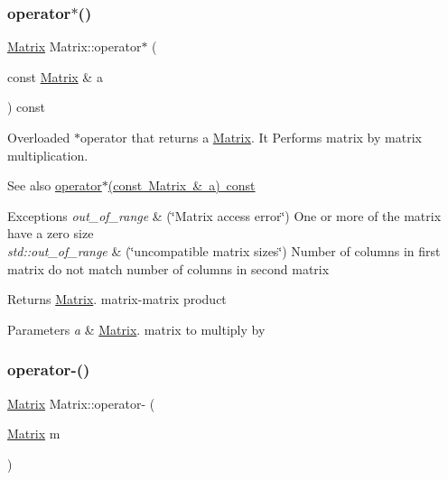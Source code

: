 \subsubsection{\texorpdfstring{operator$\ast$()}{operator*()}}
{\footnotesize\ttfamily \mbox{\hyperlink{class_matrix}{Matrix}} Matrix\+::operator$\ast$ (\begin{DoxyParamCaption}\item[{const \mbox{\hyperlink{class_matrix}{Matrix}} \&}]{a }\end{DoxyParamCaption}) const}

Overloaded $\ast$operator that returns a \mbox{\hyperlink{class_matrix}{Matrix}}. It Performs matrix by matrix multiplication. \begin{DoxySeeAlso}{See also}
\mbox{\hyperlink{class_matrix_aaa40c78e6b3bb5bbf572d35612dbf6a7}{operator$\ast$(const Matrix \& a) const}} 
\end{DoxySeeAlso}

\begin{DoxyExceptions}{Exceptions}
{\em out\+\_\+of\+\_\+range} & (\char`\"{}\+Matrix access error\char`\"{}) One or more of the matrix have a zero size \\
\hline
{\em std\+::out\+\_\+of\+\_\+range} & (\char`\"{}uncompatible matrix sizes\char`\"{}) Number of columns in first matrix do not match number of columns in second matrix \\
\hline
\end{DoxyExceptions}
\begin{DoxyReturn}{Returns}
\mbox{\hyperlink{class_matrix}{Matrix}}. matrix-\/matrix product 
\end{DoxyReturn}

\begin{DoxyParams}{Parameters}
{\em a} & \mbox{\hyperlink{class_matrix}{Matrix}}. matrix to multiply by \\
\hline
\end{DoxyParams}
\mbox{\label{class_matrix_a2aabf841a4302d528f8b102c0800a263}} 
\subsubsection{\texorpdfstring{operator-\/()}{operator-()}}
{\footnotesize\ttfamily \mbox{\hyperlink{class_matrix}{Matrix}} Matrix\+::operator-\/ (\begin{DoxyParamCaption}\item[{\mbox{\hyperlink{class_matrix}{Matrix}}}]{m }\end{DoxyParamCaption})}

